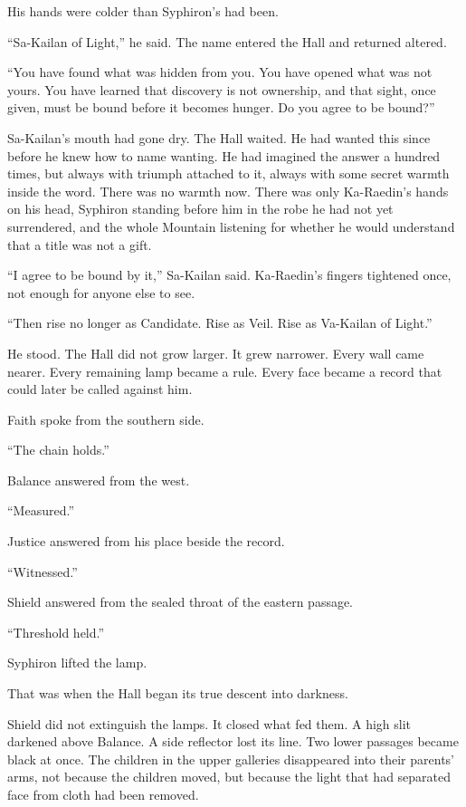 His hands were colder than Syphiron’s had been.\par
“Sa-Kailan of Light,” he said.
The name entered the Hall and returned altered.\par
“You have found what was hidden from you.
You have opened what was not yours.
You have learned that discovery is not ownership, and that sight, once given, must be bound before it becomes hunger.
Do you agree to be bound?”\par
Sa-Kailan’s mouth had gone dry.
The Hall waited.
He had wanted this since before he knew how to name wanting.
He had imagined the answer a hundred times, but always with triumph attached to it, always with some secret warmth inside the word.
There was no warmth now.
There was only Ka-Raedin’s hands on his head, Syphiron standing before him in the robe he had not yet surrendered, and the whole Mountain listening for whether he would understand that a title was not a gift.\par
“I agree to be bound by it,” Sa-Kailan said.
Ka-Raedin’s fingers tightened once, not enough for anyone else to see.\par
“Then rise no longer as Candidate.
Rise as Veil.
Rise as Va-Kailan of Light.”\par
He stood.
The Hall did not grow larger.
It grew narrower.
Every wall came nearer.
Every remaining lamp became a rule.
Every face became a record that could later be called against him.\par
Faith spoke from the southern side.\par
“The chain holds.”\par
Balance answered from the west.\par
“Measured.”\par
Justice answered from his place beside the record.\par
“Witnessed.”\par
Shield answered from the sealed throat of the eastern passage.\par
“Threshold held.”\par
Syphiron lifted the lamp.\par
That was when the Hall began its true descent into darkness.\par
Shield did not extinguish the lamps.
It closed what fed them.
A high slit darkened above Balance.
A side reflector lost its line.
Two lower passages became black at once.
The children in the upper galleries disappeared into their parents’ arms, not because the children moved, but because the light that had separated face from cloth had been removed.
